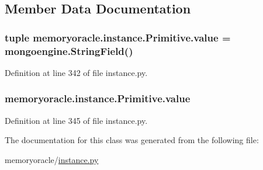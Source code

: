 \subsection{Member Data Documentation}
\hypertarget{classmemoryoracle_1_1instance_1_1Primitive_adf984d6f1bfc101cdef835b137adef55}{}
\subsubsection[{value}]{\setlength{\rightskip}{0pt plus 5cm}tuple memoryoracle.\+instance.\+Primitive.\+value = mongoengine.\+String\+Field()\hspace{0.3cm}{\ttfamily [static]}}\label{classmemoryoracle_1_1instance_1_1Primitive_adf984d6f1bfc101cdef835b137adef55}


Definition at line 342 of file instance.\+py.

\hypertarget{classmemoryoracle_1_1instance_1_1Primitive_ac1e638f21743430e98c2e3513a4556ed}{}
\subsubsection[{value}]{\setlength{\rightskip}{0pt plus 5cm}memoryoracle.\+instance.\+Primitive.\+value}\label{classmemoryoracle_1_1instance_1_1Primitive_ac1e638f21743430e98c2e3513a4556ed}


Definition at line 345 of file instance.\+py.



The documentation for this class was generated from the following file\+:\begin{DoxyCompactItemize}
\item 
memoryoracle/\hyperlink{instance_8py}{instance.\+py}\end{DoxyCompactItemize}
